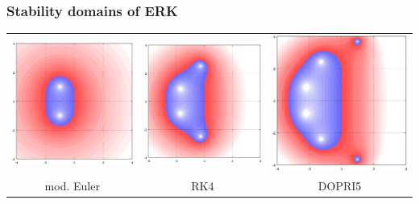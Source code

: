 \documentclass[USEnglish,ignorenonframetext,notheorems,aspectratio=1610]{beamer}
\begin{document}
\begin{frame}
  \frametitle{Stability domains of ERK}
  \begin{tabular}{ccc}
    \includegraphics[width=.3\textwidth]{fig/stability-RK2}
    &
    \includegraphics[width=.3\textwidth]{fig/stability-RK4}
    &
    \includegraphics[width=.3\textwidth]{fig/stability-DOPRI5}
    \\
    mod. Euler & RK4 & DOPRI5
  \end{tabular}
\end{frame}

\end{document}
